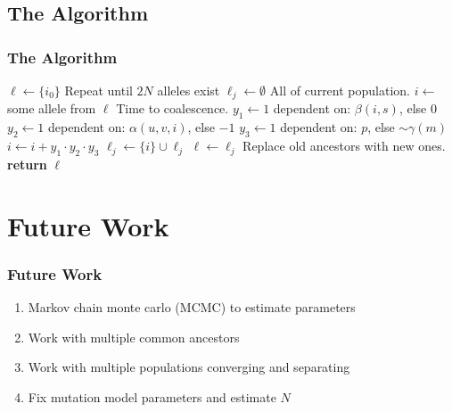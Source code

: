 \documentclass[11pt]{beamer}
\begin{document}
	\newcommand{\set}[1]{\{#1\}}
	\subsection{The Algorithm}\label{subsec:theAlgorithm}
	\begin{frame}
		\frametitle{The Algorithm}
		\begin{algorithmic}[1]
				\State $\ell \gets \set{i_0}$
				 \Comment Repeat until $2N$ alleles exist
					\State $\ell_j \gets \emptyset$
					 \Comment All of current population.
						\State $i \gets $ some allele from $\ell$
						 \Comment Time to coalescence.
							\State $y_1 \gets 1$ dependent on: $\beta(i, s)$, else $0$
							\State $y_2 \gets 1$ dependent on: $\alpha(u, v, i)$, else $-1$
							\State $y_3 \gets 1$ dependent on: $p$, else  $\sim \gamma(m)$
							\State $i \gets i + y_1 \cdot y_2 \cdot y_3$
						\EndFor
						\State $\ell_j \gets \set{i} \cup \ell_j$
					\EndFor
					\State $\ell \gets \ell_j$ \Comment Replace old ancestors with new ones.
				\EndFor
				\State \textbf{return} $\ell$
			\EndProcedure
		\end{algorithmic}
	\end{frame}

	\section{Future Work}\label{sec:futureWork}
	\begin{frame}
		\frametitle{Future Work}
		\begin{enumerate}
			\item Markov chain monte carlo (MCMC) to estimate parameters \smallskip
			\item Work with multiple common ancestors \smallskip
			\item Work with multiple populations converging and separating \smallskip
			\item Fix mutation model parameters and estimate $N$ \smallskip
		\end{enumerate}
	\end{frame}

	\section{}\label{sec:}
	\begin{frame}
		\centering{\Huge{Questions?}}
	\end{frame}
\end{document}

